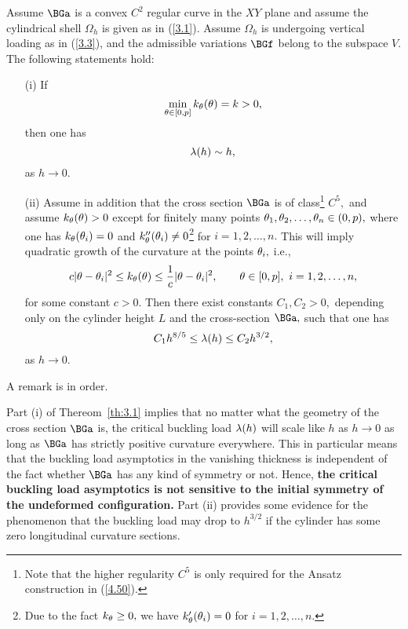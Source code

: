 \begin{theorem}
\label{th:3.1}
Assume $\BGa$ is a convex $C^2$ regular curve in the $XY$ plane and assume the cylindrical shell $\Omega_h$ is given as in (\ref{3.1}). Assume $\Omega_h$ is undergoing vertical loading as in (\ref{3.3}), and the admissible variations $\BGf$ belong to the subspace $V.$ The following statements hold:
\begin{itemize}
\item[(i)] If 
$$\min_{\theta\in[0,p]}k_\theta(\theta)=k>0,$$
then one has 
$$\lambda(h)\sim h,$$
as $h\to 0.$
\item[(ii)]  Assume in addition that the cross section $\BGa$ is of class\footnote{Note that the higher regularity $C^5$ is only required for the Ansatz construction in (\ref{4.50}).} $C^5,$ and assume $k_\theta(\theta)>0$ except for finitely many points $\theta_1,\theta_2,\dots,\theta_n\in (0,p),$ where one has $k_\theta(\theta_i)=0$ and $k_\theta''(\theta_i)\neq 0$\footnote{Due to the fact $k_\theta\geq 0,$ we have $k_\theta'(\theta_i)=0$ for $i=1,2,\dots,n.$} for $i=1,2,\dots,n.$ This will imply quadratic growth of the curvature at the points $\theta_i,$ i.e., 
\begin{equation}
\label{3.6}
c|\theta-\theta_i|^2\leq k_\theta(\theta)\leq \frac{1}{c}|\theta-\theta_i|^2,\qquad \theta\in [0,p],\ i=1,2,\dots,n,
\end{equation}
for some constant $c>0.$ Then there exist constants $C_1,C_2>0,$ depending only on the cylinder height $L$ and the cross-section 
$\BGa,$ such that one has 
$$C_1h^{8/5}\leq \lambda(h)\leq C_2h^{3/2},$$
 as $h\to 0.$
\end{itemize}
\end{theorem}

A remark is in order. 

\begin{remark}
\label{rem:3.2}
Part (i) of Thereom~\ref{th:3.1} implies that no matter what the geometry of the cross section $\BGa$ is, the critical buckling load $\lambda(h)$ will scale like $h$ as $h\to 0$
as long as $\BGa$ has strictly positive curvature everywhere. This in particular means that the buckling load asymptotics in the vanishing thickness is independent of the fact whether $\BGa$ has any kind of symmetry or not. Hence, \textbf{the critical buckling load asymptotics is not sensitive
to the initial symmetry of the undeformed configuration.} Part (ii) provides some evidence for the phenomenon that the buckling load may drop to $h^{3/2}$ if the cylinder has some zero longitudinal curvature sections. 
\end{remark}



